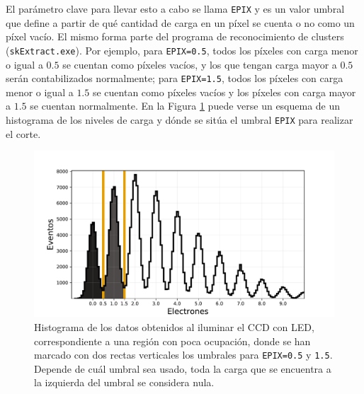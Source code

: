 El parámetro clave para llevar esto a cabo se llama \verb|EPIX| y es un valor umbral que define a partir de qué cantidad de carga en un píxel se cuenta o no como un píxel vacío. El mismo forma parte del programa de reconocimiento de clusters (\verb|skExtract.exe|). Por ejemplo, para \verb|EPIX=0.5|, todos los píxeles con carga menor o igual a $0.5$ se cuentan como píxeles vacíos, y los que tengan carga mayor a $0.5$ serán contabilizados normalmente; para \verb|EPIX=1.5|, todos los píxeles con carga menor o igual a $1.5$ se cuentan como píxeles vacíos y los píxeles con carga mayor a $1.5$ se cuentan normalmente. En la Figura \ref{fig:HistogramaEPIX} puede verse un esquema de un histograma de los niveles de carga y dónde se sitúa el umbral \verb|EPIX| para realizar el corte.
\begin{figure}[h]
    \centering
        \includegraphics[scale=0.5]{Figs/EsquemaEPIX_histocarga.pdf}
    \caption{Histograma de los datos obtenidos al iluminar el CCD con LED, correspondiente a una región con poca ocupación, donde se han marcado con dos rectas verticales los umbrales para \texttt{EPIX=0.5} y \texttt{1.5}. Depende de cuál umbral sea usado, toda la carga que se encuentra a la izquierda del umbral se considera nula.}
    \label{fig:HistogramaEPIX}
\end{figure}

